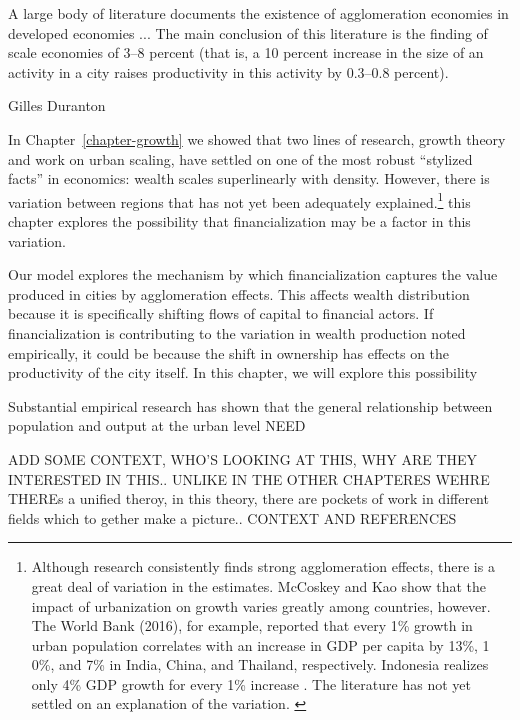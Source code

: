 \epigraph{A large body of literature documents the existence of agglomeration economies in developed economies ... The main conclusion of this literature is the finding of scale economies of 3--8 percent (that is, a 10 percent increase in the size of an activity in a city raises productivity in this activity by 0.3--0.8 percent).}{Gilles Duranton \cite{durantonAreCitiesEngines2009}} %


{\color{black} In Chapter~\ref{chapter-growth} we showed that two lines of research, growth theory and work on urban scaling, have settled on one of the most robust ``stylized facts'' in economics: wealth scales superlinearly with density. However, there is variation between regions that has not yet been adequately explained.\footnote{Although research consistently finds strong agglomeration effects, there is a great deal of variation in the estimates. McCoskey and Kao \cite{mccoskeyPanelDataInvestigation} show that the impact of urbanization on growth varies greatly among countries, however. The World Bank (2016), for example, reported that every 1\% growth in urban population correlates with an increase in GDP per capita by 13\%, 1
0\%, and 7\% in India, China, and Thailand, respectively. Indonesia realizes only 4\% GDP growth for every 1\% increase \cite{haryantotriRelationshipUrbanizationEducation2021}.  The literature has not yet settled on an explanation of the variation.  \cite{loboUrbanScalingProduction2013, pugaMagnitudeCausesAgglomeration2010} } this chapter explores the possibility that financialization may be a factor in this variation. 

Our model explores the mechanism by which financialization captures the value produced in cities by agglomeration effects. This affects wealth distribution because it is specifically shifting flows of capital to financial actors. If financialization is contributing to the variation in wealth production noted empirically, it could be because the shift in ownership has effects on the productivity of the city itself. In this chapter, we will explore this possibility}

Substantial empirical research has shown that the general relationship  between population and output at the urban level NEED 


ADD SOME CONTEXT, WHO'S LOOKING AT THIS, WHY ARE THEY INTERESTED IN THIS..  UNLIKE IN  THE OTHER CHAPTERES WEHRE THEREs a unified theroy, in this theory, there are pockets of work  in different fields which to gether make a picture.. 
CONTEXT AND REFERENCES 

